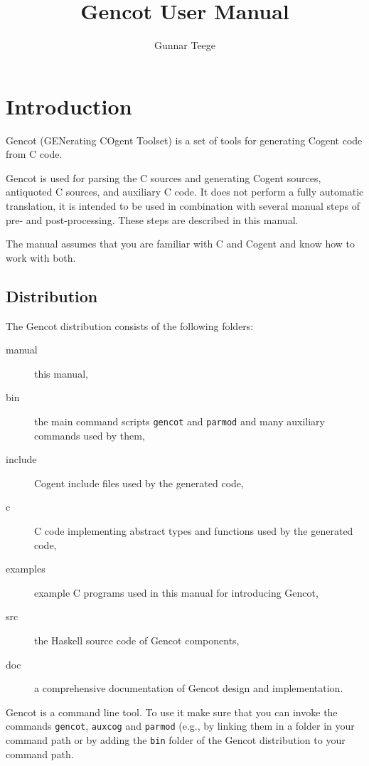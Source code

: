 \documentclass[a4paper]{report}
\newcommand{\code}[1]{\textnormal{\texttt{#1}}}
\begin{document}
\title{Gencot User Manual}
\author{Gunnar Teege}

\maketitle

\chapter{Introduction}

Gencot (GENerating COgent Toolset) is a set of tools for generating Cogent code from C code. 

Gencot is used for parsing the C sources and generating Cogent sources, 
antiquoted C sources, and auxiliary C code. It does not perform a fully automatic translation, it is
intended to be used in combination with several manual steps of pre- and post-processing. These
steps are described in this manual.

The manual assumes that you are familiar with C and Cogent and know how to work with both.

\section{Distribution}
\label{intro-dist}

The Gencot distribution consists of the following folders:
\begin{description}
\item[manual] this manual,
\item[bin] the main command scripts \code{gencot} and \code{parmod} and many auxiliary commands used by them,
\item[include] Cogent include files used by the generated code,
\item[c] C code implementing abstract types and functions used by the generated code,
\item[examples] example C programs used in this manual for introducing Gencot,
\item[src] the Haskell source code of Gencot components,
\item[doc] a comprehensive documentation of Gencot design and implementation.
\end{description}

Gencot is a command line tool. To use it make sure that you can invoke the commands \code{gencot}, \code{auxcog} and
\code{parmod} (e.g., by linking them in a folder in your command path or by adding the \code{bin} folder
of the Gencot distribution to your command path.
\end{document}

